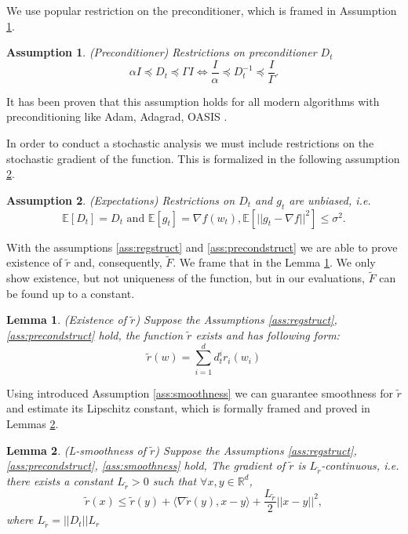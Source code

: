 \documentclass[USenglish]{article}
\theoremstyle{dgthm}
\newtheorem{assumption}{Assumption}
\newtheorem{lemma}{Lemma}
\theoremstyle{dgdef}
\begin{document}
We use popular restriction on the preconditioner, which is framed in Assumption \ref{ass:preconditioned}.

\begin{assumption}{(Preconditioner)}
\label{ass:preconditioned}
Restrictions on preconditioner $D_t$
\begin{equation}
\alpha I \preccurlyeq D_t \preccurlyeq \Gamma I \Leftrightarrow \frac{I}{\alpha} \preccurlyeq D_t^{-1} \preccurlyeq \frac{I}{\Gamma}.
\end{equation}
\end{assumption}

It has been proven that this assumption holds for all modern algorithms with preconditioning like Adam, Adagrad, OASIS \citep{beznosikov2022scaled}.

In order to conduct a stochastic analysis we must include restrictions on the stochastic gradient of the function.
This is formalized in the following assumption \ref{ass:expectations}.

\begin{assumption}{(Expectations)}
\label{ass:expectations}
Restrictions on $D_t$ and $g_t$ are unbiased, i.e.
\begin{equation}
\mathbb{E} \left[ D_t \right] = D_t \text{ and }\mathbb{E}\left[ g_t \right] = \nabla f (w_t), \mathbb{E}\left[ ||g_t - \nabla f||^2 \right] \leq \sigma^2.
\end{equation}
\end{assumption}

With the assumptions \ref{ass:regstruct} and \ref{ass:precondstruct} we are able to prove existence of $\widetilde{r}$ and, consequently, $\widetilde{F}$. We frame that in the Lemma \ref{lemma:existence}. We only show existence, but not uniqueness of the function, but in our evaluations, $\widetilde{F}$ can be found up to a constant.

\begin{lemma}
\label{lemma:existence}
{(Existence of $\widetilde{r}$)}
    Suppose the Assumptions \ref{ass:regstruct}, \ref{ass:precondstruct} hold, the function $\widetilde{r}$ exists and has following form:
    $$\widetilde{r}(w) = \sum_{i=1}^d d_t^i r_i(w_i)$$
\end{lemma}

Using introduced Assumption \ref{ass:smoothness} we can guarantee smoothness for $\widetilde{r}$ and estimate its Lipschitz constant, which is formally framed and proved in Lemmas \ref{lemma:tildesmoothness}.

\begin{lemma}\label{lemma:tildesmoothness}{(L-smoothness of $\widetilde{r}$)}
Suppose the Assumptions \ref{ass:regstruct}, \ref{ass:precondstruct}, \ref{ass:smoothness} hold,
The gradient of $\widetilde{r}$ is $L_{\tilde{r}}$-continuous, i.e.  there exists a constant $L_{\tilde{r}} > 0$ such that $\forall x, y \in \mathbb{R}^d$,
    	\begin{equation*}
    		\widetilde{r}(x) \leq \widetilde{r}(y) + \langle \nabla \widetilde{r}(y), x-y \rangle + \frac{L_{\tilde{r}}}{2} ||x - y||^2,
    	\end{equation*}
     where $L_{\tilde{r}} = ||D_t|| L_r$
\end{lemma}
\end{document}
